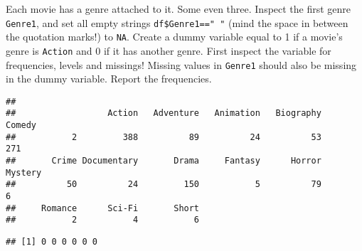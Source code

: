 \documentclass[
]{article}
\newenvironment{Shaded}{\begin{snugshade}}{\end{snugshade}}
\newcommand{\CommentTok}[1]{\textcolor[rgb]{0.56,0.35,0.01}{\textit{#1}}}
\newcommand{\DecValTok}[1]{\textcolor[rgb]{0.00,0.00,0.81}{#1}}
\newcommand{\FloatTok}[1]{\textcolor[rgb]{0.00,0.00,0.81}{#1}}
\newcommand{\KeywordTok}[1]{\textcolor[rgb]{0.13,0.29,0.53}{\textbf{#1}}}
\newcommand{\NormalTok}[1]{#1}
\newcommand{\OperatorTok}[1]{\textcolor[rgb]{0.81,0.36,0.00}{\textbf{#1}}}
\newcommand{\OtherTok}[1]{\textcolor[rgb]{0.56,0.35,0.01}{#1}}
\newcommand{\StringTok}[1]{\textcolor[rgb]{0.31,0.60,0.02}{#1}}
\begin{document}
Each movie has a genre attached to it. Some even three. Inspect the
first genre \texttt{Genre1}, and set all empty strings
\texttt{df\$Genre1=="\ "} (mind the space in between the quotation
marks!) to \texttt{NA}. Create a dummy variable equal to 1 if a movie's
genre is \texttt{Action} and 0 if it has another genre. First inspect
the variable for frequencies, levels and missings! Missing values in
\texttt{Genre1} should also be missing in the dummy variable. Report the
frequencies.

\begin{Shaded}
\end{Shaded}

\begin{verbatim}
## 
##                  Action   Adventure   Animation   Biography      Comedy 
##           2         388          89          24          53         271 
##       Crime Documentary       Drama     Fantasy      Horror     Mystery 
##          50          24         150           5          79           6 
##     Romance      Sci-Fi       Short 
##           2           4           6
\end{verbatim}

\begin{Shaded}
\end{Shaded}

\begin{verbatim}
## [1] 0 0 0 0 0 0
\end{verbatim}
\end{document}
